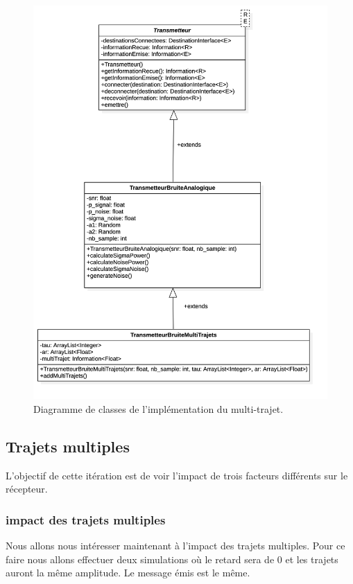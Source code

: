 \begin{figure}[H]
\centering
\includegraphics[width=\textwidth]{img/transm_multiTrajets.png}
\caption{\label{fig:image23}Diagramme de classes de l'implémentation du multi-trajet.}
\end{figure}

\pagebreak

\subsection{Trajets multiples}

L'objectif de cette itération est de voir l'impact de trois facteurs différents sur le récepteur. 

\subsubsection{impact des trajets multiples}

Nous allons nous intéresser maintenant à l'impact des trajets multiples. Pour ce faire nous allons effectuer deux simulations où le retard sera de 0 et les trajets auront la même amplitude. Le message émis est le même.

